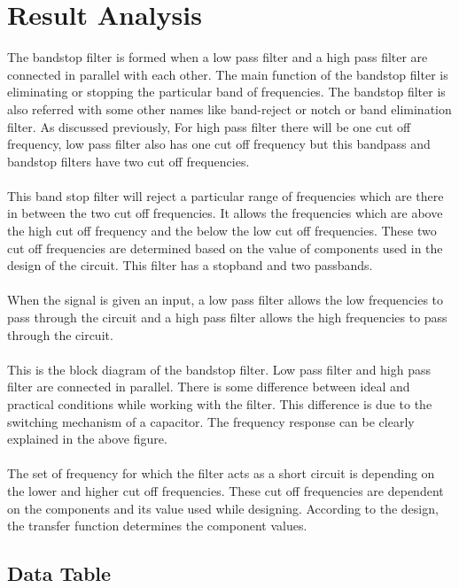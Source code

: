 \documentclass[12pt]{article}
\begin{document}
\section{Result Analysis}
The bandstop filter is formed when a low pass filter and a high pass filter are connected in parallel with each other. The main function of the bandstop filter is eliminating or stopping the particular band of frequencies. The bandstop filter is also referred with some other names like band-reject or notch or band elimination filter. As discussed previously, For high pass filter there will be one cut off frequency, low pass filter also has one cut off frequency but this bandpass and bandstop filters have two cut off frequencies. \\~\\

This band stop filter will reject a particular range of frequencies which are there in between the two cut off frequencies. It allows the frequencies which are above the high cut off frequency and the below the low cut off frequencies. These two cut off frequencies are determined based on the value of components used in the design of the circuit. This filter has a stopband and two passbands. \\~\\

When the signal is given an input, a low pass filter allows the low frequencies to pass through the circuit and a high pass filter allows the high frequencies to pass through the circuit. \\~\\

This is the block diagram of the bandstop filter. Low pass filter and high pass filter are connected in parallel. There is some difference between ideal and practical conditions while working with the filter. This difference is due to the switching mechanism of a capacitor. The frequency response can be clearly explained in the above figure. \\~\\

The set of frequency for which the filter acts as a short circuit is depending on the lower and higher cut off frequencies. These cut off frequencies are dependent on the components and its value used while designing. According to the design, the transfer function determines the component values.

\newpage
\subsection{Data Table}
\end{document}
